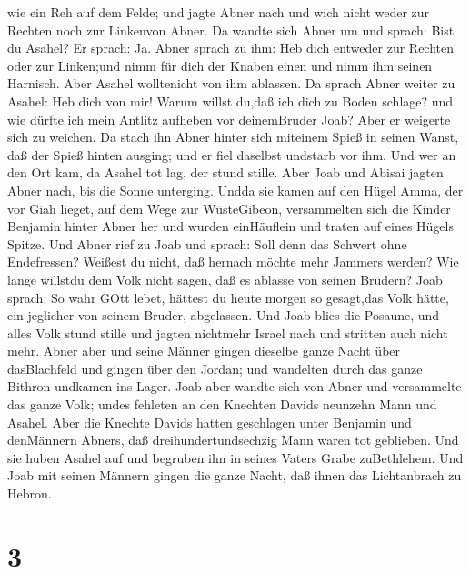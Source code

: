 wie ein Reh auf dem Felde;  und jagte Abner nach und wich
nicht weder zur Rechten noch zur Linkenvon Abner.  Da
wandte sich Abner um und sprach: Bist du Asahel? Er sprach: Ja.
 Abner sprach zu ihm: Heb dich entweder zur Rechten oder
zur Linken;und nimm für dich der Knaben einen und nimm ihm seinen
Harnisch. Aber Asahel wolltenicht von ihm ablassen.  Da
sprach Abner weiter zu Asahel: Heb dich von mir! Warum willst du,daß ich
dich zu Boden schlage? und wie dürfte ich mein Antlitz aufheben vor
deinemBruder Joab?  Aber er weigerte sich zu weichen. Da
stach ihn Abner hinter sich miteinem Spieß in seinen Wanst, daß der
Spieß hinten ausging; und er fiel daselbst undstarb vor ihm. Und wer an
den Ort kam, da Asahel tot lag, der stund stille.  Aber
Joab und Abisai jagten Abner nach, bis die Sonne unterging. Undda sie
kamen auf den Hügel Amma, der vor Giah lieget, auf dem Wege zur
WüsteGibeon,  versammelten sich die Kinder Benjamin hinter
Abner her und wurden einHäuflein und traten auf eines Hügels Spitze.
 Und Abner rief zu Joab und sprach: Soll denn das Schwert
ohne Endefressen? Weißest du nicht, daß hernach möchte mehr Jammers
werden? Wie lange willstdu dem Volk nicht sagen, daß es ablasse von
seinen Brüdern?  Joab sprach: So wahr GOtt lebet, hättest
du heute morgen so gesagt,das Volk hätte, ein jeglicher von seinem
Bruder, abgelassen.  Und Joab blies die Posaune, und alles
Volk stund stille und jagten nichtmehr Israel nach und stritten auch
nicht mehr.  Abner aber und seine Männer gingen dieselbe
ganze Nacht über dasBlachfeld und gingen über den Jordan; und wandelten
durch das ganze Bithron undkamen ins Lager.  Joab aber
wandte sich von Abner und versammelte das ganze Volk; undes fehleten an
den Knechten Davids neunzehn Mann und Asahel.  Aber die
Knechte Davids hatten geschlagen unter Benjamin und denMännern Abners,
daß dreihundertundsechzig Mann waren tot geblieben.  Und
sie huben Asahel auf und begruben ihn in seines Vaters Grabe
zuBethlehem. Und Joab mit seinen Männern gingen die ganze Nacht, daß
ihnen das Lichtanbrach zu Hebron.

\hypertarget{section-2}{%
\section{3}\label{section-2}}


